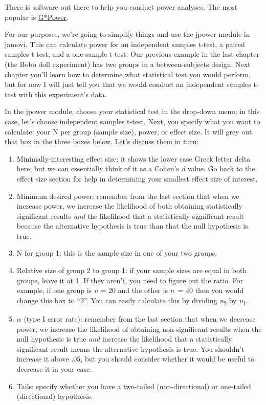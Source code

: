 \documentclass[
]{book}
\providecommand{\tightlist}{%
  \setlength{\itemsep}{0pt}\setlength{\parskip}{0pt}}
\begin{document}
There is software out there to help you conduct power analyses. The most popular is \href{https://www.psychologie.hhu.de/arbeitsgruppen/allgemeine-psychologie-und-arbeitspsychologie/gpower.html}{G*Power}.

For our purposes, we're going to simplify things and use the jpower module in jamovi. This can calculate power for an independent samples t-test, a paired samples t-test, and a one-sample t-test. Our previous example in the last chapter (the Bobo doll experiment) has two groups in a between-subjects design. Next chapter you'll learn how to determine what statistical test you would perform, but for now I will just tell you that we would conduct an independent samples t-test with this experiment's data.

In the jpower module, choose your statistical test in the drop-down menu; in this case, let's choose independent samples t-test. Next, you specify what you want to calculate: your N per group (sample size), power, or effect size. It will grey out that box in the three boxes below. Let's discuss them in turn:

\begin{enumerate}
\def\labelenumi{\arabic{enumi}.}
\tightlist
\item
  Minimally-interesting effect size: it shows the lower case Greek letter delta here, but we can essentially think of it as a Cohen's \emph{d} value. Go back to the effect size section for help in determining your smallest effect size of interest.
\item
  Minimum desired power: remember from the last section that when we increase power, we increase the likelihood of both obtaining statistically significant results \emph{and} the likelihood that a statistically significant result because the alternative hypothesis is true than that the null hypothesis is true.
\item
  N for group 1: this is the sample size in one of your two groups.
\item
  Relative size of group 2 to group 1: if your sample sizes are equal in both groups, leave it at 1. If they aren't, you need to figure out the ratio. For example, if one group is \emph{n} = 20 and the other is \emph{n}~= 40 then you would change this box to ``2''. You can easily calculate this by dividing \emph{n}\textsubscript{2} by \emph{n}\textsubscript{1}.
\item
  \(\alpha\) (type I error rate): remember from the last section that when we decrease power, we increase the likelihood of obtaining non-significant results when the null hypothesis is true \emph{and} increase the likelihood that a statistically significant result means the alternative hypothesis is true. You shouldn't increase it above .05, but you should consider whether it would be useful to decrease it in your case.
\item
  Tails: specify whether you have a two-tailed (non-directional) or one-tailed (directional) hypothesis.
\end{enumerate}
\end{document}
